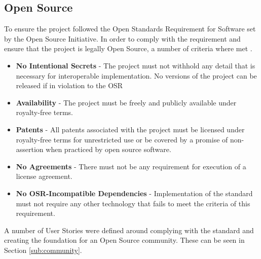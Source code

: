 \subsection{Open Source}
To ensure the project followed the Open Standards Requirement for Software set by the Open Source Initiative. In order to comply with the requirement and ensure that the project is legally Open Source, a number of criteria where met \citep{initiative_2018}.
\begin{itemize}
    \item \textbf{No Intentional Secrets} - The project must not withhold any detail that is necessary for interoperable implementation. No versions of the project can be released if in violation to the OSR
    \item \textbf{Availability} - The project must be freely and publicly available under royalty-free terms.
    \item \textbf{Patents} - All patents associated with the project must be licensed under royalty-free terms for unrestricted use or be covered by a promise of non-assertion when practiced by open source software.
    \item \textbf{No Agreements} - There must not be any requirement for execution of a license agreement.
    \item \textbf{No OSR-Incompatible Dependencies} - Implementation of the standard must not require any other technology that fails to meet the criteria of this requirement.
\end{itemize}
A number of User Stories were defined around complying with the standard and creating the foundation for an Open Source community. These can be seen in Section \ref{sub:community}. 




